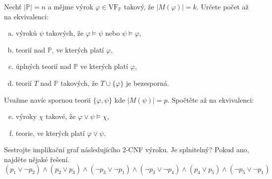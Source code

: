 \begin{problem}

    Nechť $|\mathbb{P}|=n$ a mějme výrok $\varphi\in\mathrm{VF}_{\mathbb{P}}$ takový, že $|M(\varphi)|=k$. Určete počet až na ekvivalenci:
    \begin{enumerate}[(a)]
        \item výroků $\psi$ takových, že $\varphi \models \psi$ nebo $\psi \models \varphi$,
        \item teorií nad $\mathbb{P}$, ve kterých platí $\varphi$,
        \item úplných teorií nad $\mathbb{P}$ ve kterých platí $\varphi$,
        \item teorií $T$ nad $\mathbb{P}$ takových, že $T \cup \{\varphi\}$ je bezesporná.
    \end{enumerate}
    Uvažme navíc spornou teorii $\{\varphi,\psi\}$ kde $|M(\psi)|=p$. Spočtěte až na ekvivalenci:
    \begin{enumerate}[(a)]\setcounter{enumi}{4}
        \item výroky $\chi$ takové, že $\varphi \vee \psi \models \chi$, 
        \item teorie, ve kterých platí $\varphi \vee \psi$.
    \end{enumerate}

    \begin{solution}
                
    \end{solution}
    
\end{problem}


\begin{problem} \label{problem:2sat}
    
    Sestrojte implikační graf následujícího 2-CNF výroku. Je splnitelný? Pokud ano, najděte nějaké řešení.
    $$
    (p_1\vee \neg p_2)\wedge (p_2\vee p_3)\wedge (\neg p_3\vee \neg p_1)\wedge (\neg p_3\vee \neg p_4)\wedge (p_4\vee p_5)\wedge (\neg p_5\vee \neg p_1)
    $$

    \begin{solution}
                
    \end{solution}


\end{problem}


